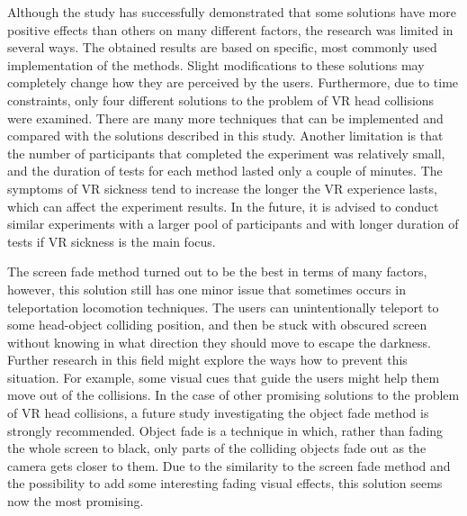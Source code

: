 Although the study has successfully demonstrated that some solutions have more positive effects than others on many different factors, the research was limited in several ways. The obtained results are based on specific, most commonly used implementation of the methods. Slight modifications to these solutions may completely change how they are perceived by the users. Furthermore, due to time constraints, only four different solutions to the problem of VR head collisions were examined. There are many more techniques that can be implemented and compared with the solutions described in this study. Another limitation is that the number of participants that completed the experiment was relatively small, and the duration of tests for each method lasted only a couple of minutes. The symptoms of VR sickness tend to increase the longer the VR experience lasts, which can affect the experiment results. In the future, it is advised to conduct similar experiments with a larger pool of participants and with longer duration of tests if VR sickness is the main focus.

The screen fade method turned out to be the best in terms of many factors, however, this solution still has one minor issue that sometimes occurs in teleportation locomotion techniques. The users can unintentionally teleport to some head-object colliding position, and then be stuck with obscured screen without knowing in what direction they should move to escape the darkness. Further research in this field might explore the ways how to prevent this situation. For example, some visual cues that guide the users might help them move out of the collisions. In the case of other promising solutions to the problem of VR head collisions, a future study investigating the object fade method is strongly recommended. Object fade is a technique in which, rather than fading the whole screen to black, only parts of the colliding objects fade out as the camera gets closer to them. Due to the similarity to the screen fade method and the possibility to add some interesting fading visual effects, this solution seems now the most promising.